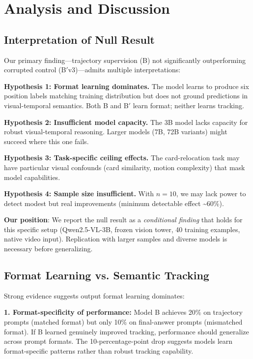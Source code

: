 \section{Analysis and Discussion}
\label{sec:analysis}

\subsection{Interpretation of Null Result}

Our primary finding---trajectory supervision (B) not significantly outperforming corrupted control (B$'$v3)---admits multiple interpretations:

\textbf{Hypothesis 1: Format learning dominates.} The model learns to produce six position labels matching training distribution but does not ground predictions in visual-temporal semantics. Both B and B$'$ learn format; neither learns tracking.

\textbf{Hypothesis 2: Insufficient model capacity.} The 3B model lacks capacity for robust visual-temporal reasoning. Larger models (7B, 72B variants) might succeed where this one fails.

\textbf{Hypothesis 3: Task-specific ceiling effects.} The card-relocation task may have particular visual confounds (card similarity, motion complexity) that mask model capabilities.

\textbf{Hypothesis 4: Sample size insufficient.} With $n=10$, we may lack power to detect modest but real improvements (minimum detectable effect \textasciitilde60\%).

\textbf{Our position}: We report the null result as a \emph{conditional finding} that holds for this specific setup (Qwen2.5-VL-3B, frozen vision tower, 40 training examples, native video input). Replication with larger samples and diverse models is necessary before generalizing.

\subsection{Format Learning vs. Semantic Tracking}

Strong evidence suggests output format learning dominates:

\textbf{1. Format-specificity of performance:} Model B achieves 20\% on trajectory prompts (matched format) but only 10\% on final-answer prompts (mismatched format). If B learned genuinely improved tracking, performance should generalize across prompt formats. The 10-percentage-point drop suggests models learn format-specific patterns rather than robust tracking capability.

